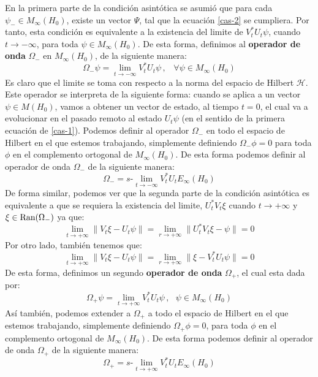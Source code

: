 \documentclass[12pt]{book}
\numberwithin{equation}{chapter}
\def\rar{\rightarrow}
\def\H{\mathcal{H}}
\def\O{\Omega}
\def\slim{s\mbox{-}\lim}
\begin{document}
En la primera parte de la condici\'on asint\'otica se asumi\'o que para cada $ \psi_{-} \in M_{\infty}(H_{0}) $, existe un vector $\Psi$, tal que la ecuaci\'on \eqref{cas-2} se cumpliera. Por tanto, esta condici\'on es equivalente a la existencia del limite de $V_{t}^{*} U_{t} \psi $, cuando $t \rar -\infty$, para toda $ \psi \in M_{\infty}(H_{0}) $. De esta forma, definimos al {\bf operador de onda} $\Omega_{-}$ en $M_{\infty}(H_{0})$, de la siguiente manera:
$$ \Omega_{-} \psi = \lim_{t \rar -\infty} V_{t}^{*} U_{t} \psi \,,\,\,\,\,\, \forall \psi \in M_{\infty}(H_{0}) $$
Es claro que el limite se toma con respecto a la norma del espacio de Hilbert $\H$. Este operador se interpreta de la siguiente forma: cuando se aplica a un vector $\psi \in M(H_{0})$, vamos a obtener un vector de estado, al tiempo $t=0$, el cual va a evolucionar en el pasado remoto al estado $U_{t} \psi$ (en el sentido de la primera ecuaci\'on de \eqref{cas-1}). Podemos definir al operador $\Omega_{-}$ en todo el espacio de Hilbert en el que estemos trabajando, simplemente definiendo $ \Omega_{-} \phi =0$ para toda $\phi$ en el complemento ortogonal de $M_{\infty}(H_{0})$. De esta forma podemos definir al operador de onda $\O_{-}$ de la siguiente manera:
\begin{equation}\label{wop-}
\Omega_{-}  = \slim_{t \rar -\infty} V_{t}^{*} U_{t} E_{\infty}(H_{0}) 
\end{equation}
De forma similar, podemos ver que la segunda parte de la condici\'on asint\'otica es equivalente a que se requiera la existencia del limite, $ U_{t}^{*}V_{t} \xi $ cuando $t \rar +\infty$ y $\xi \in \hbox{Ran}(\Omega_{-})$ ya que:
\begin{equation}\label{wap-a}
\lim_{t \rar +\infty} \| V_{t}\xi - U_{t} \psi \|= \lim_{r \rar +\infty} \| U_{t}^{*}V_{t} \xi - \psi \|=0
\end{equation}
Por otro lado, tambi\'en tenemos que:
\begin{equation}\label{wap-b}
\lim_{t \rar +\infty} \| V_{t}\xi - U_{t} \psi \|= \lim_{r \rar +\infty} \|  \xi - V_{t}^{*}U_{t} \psi \|=0
\end{equation}
De esta forma, definimos un segundo {\bf operador de onda} $\Omega_{+}$, el cual esta dada por:
$$ \Omega_{+} \psi = \lim_{t \rar +\infty} V_{t}^{*} U_{t} \psi \,,\,\,\,\, \psi \in M_{\infty}(H_{0}) $$
As\'i tambi\'en, podemos extender a $\O_{+}$ a todo el espacio de Hilbert en el que estemos trabajando, simplemente definiendo $\O_{+} \phi=0 $, para toda $\phi$ en el complemento ortogonal de $M_{\infty}(H_{0})$. De esta forma podemos definir al operador de onda $\O_{+}$ de la siguiente manera:
\begin{equation}\label{wop+}
\Omega_{+}  = \slim_{t \rar +\infty} V_{t}^{*} U_{t} E_{\infty}(H_{0}) 
\end{equation}
\end{document}
